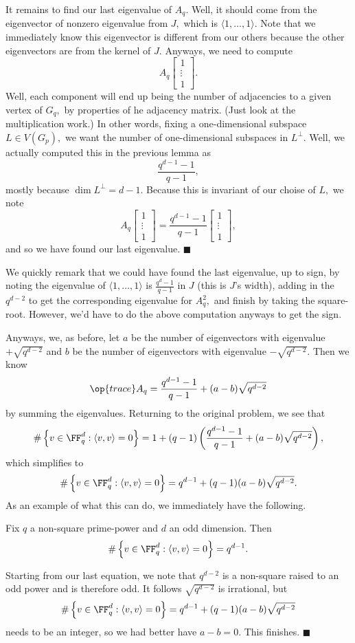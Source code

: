 It remains to find our last eigenvalue of $A_q.$ Well, it should come from the eigenvector of nonzero eigenvalue from $J,$ which is $\langle1,\ldots,1\rangle.$ Note that we immediately know this eigenvector is different from our others because the other eigenvectors are from the kernel of $J.$ Anyways, we need to compute
\[A_q\begin{bmatrix}1 \\ \vdots \\ 1\end{bmatrix}.\]
Well, each component will end up being the number of adjacencies to a given vertex of $G_q,$ by properties of he adjacency matrix. (Just look at the multiplication work.) In other words, fixing a one-dimensional subspace $L\in V(G_p),$ we want the number of one-dimensional subspaces in $L^\perp.$ Well, we actually computed this in the previous lemma as
\[\frac{q^{d-1}-1}{q-1},\]
mostly because $\dim L^\perp=d-1.$ Because this is invariant of our choise of $L,$ we note
\[A_q\begin{bmatrix}1 \\ \vdots \\ 1\end{bmatrix}=\frac{q^{d-1}-1}{q-1}\begin{bmatrix}1 \\ \vdots \\ 1\end{bmatrix},\]
and so we have found our last eigenvalue. $\blacksquare$

We quickly remark that we could have found the last eigenvalue, up to sign, by noting the eigenvalue of $\langle1,\ldots,1\rangle$ is $\frac{q^d-1}{q-1}$ in $J$ (this is $J$'s width), adding in the $q^{d-2}$ to get the corresponding eigenvalue for $A_q^2,$ and finish by taking the square-root. However, we'd have to do the above computation anyways to get the sign.

Anyways, we, as before, let $a$ be the number of eigenvectors with eigenvalue $+\sqrt{q^{d-2}}$ and $b$ be the number of eigenvectors with eigenvalue $-\sqrt{q^{d-2}}.$ Then we know
\[\op{trace}A_q=\frac{q^{d-1}-1}{q-1}+(a-b)\sqrt{q^{d-2}}\]
by summing the eigenvalues. Returning to the original problem, we see that
\[\#\left\{v\in\FF_q^d:\langle v,v\rangle=0\right\}=1+(q-1)\left(\frac{q^{d-1}-1}{q-1}+(a-b)\sqrt{q^{d-2}}\right),\]
which simplifies to
\[\#\left\{v\in\FF_q^d:\langle v,v\rangle=0\right\}=q^{d-1}+(q-1)(a-b)\sqrt{q^{d-2}}.\]
As an example of what this can do, we immediately have the following.
\begin{proposition}
    Fix $q$ a non-square prime-power and $d$ an odd dimension. Then
    \[\#\left\{v\in\FF_q^d:\langle v,v\rangle=0\right\}=q^{d-1}.\]
\end{proposition}
Starting from our last equation, we note that $q^{d-2}$ is a non-square raised to an odd power and is therefore odd. It follows $\sqrt{q^{d-2}}$ is irrational, but
\[\#\left\{v\in\FF_q^d:\langle v,v\rangle=0\right\}=q^{d-1}+(q-1)(a-b)\sqrt{q^{d-2}}\]
needs to be an integer, so we had better have $a-b=0.$ This finishes. $\blacksquare$


